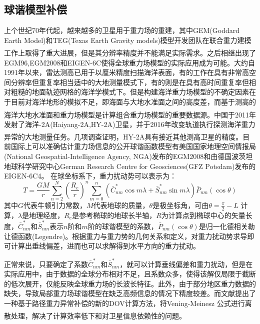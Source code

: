 \documentclass[12pt,a4,utf8]{article}
\newcommand{\upcite}[1]{\textsuperscript{\textsuperscript{\cite{#1}}}} %
\begin{document}
\subsection{球谐模型补偿}
上个世纪70年代起，越来越多的卫星用于重力场的重建，其中GEM(Goddard Earth Model)和TEG(Texas Earth Gravity models)模型开发团队在联合重力建模工作上取得了重大进展\upcite{lerch1972gravitational,tapley1997teg}，但是其分辨率精度并不能满足实际需求。之后相继出现了EGM96,EGM2008和EIGEN-6C使得全球重力场模型的实际应用成为可能。大约自1991年以来，雷达测高已用于以厘米精度扫描海洋表面，有的工作在具有非常高空间分辨率但重复率相当适中的大地测量模式下，有的则是在具有高时间重复率但相对粗糙的地面轨迹网格的海洋学模式下。但是构建海洋重力场模型的不确定因素在于目前对海洋地形的模拟不足，即海面与大地水准面之间的高度差，而基于测高的海洋大地水准面和重力场模型是计算组合重力场模型的重要数据源\upcite{pavlis2012development,flechtner2021satellite}。中国于2011年发射了海洋-2A(Haiyang-2A,HY-2A)卫星，并于2016年改变轨道执行探测海洋重力异常的大地测量任务。几项调查证明\upcite{jiang2019measurement,liu2020preliminary,wan2020vertical,zhang2020inversion,zhu2019hy,ji2021deflections,guo2022accuracy,guo2022accuracy}，HY-2A具有接近其他测高卫星的精度。目前国际上可以准确估计重力场信息的公开球谐函数模型有美国国家地理空间情报局(National Geospatial-Intelligence Agency, NGA)发布的EGM2008和由德国波茨坦地球科学研究中心German Research Centre for Geosciences(GFZ Potsdam)发布的EIGEN-6C4。
在球坐标系下，重力扰动势可以表示为：
\begin{equation}
      T = \frac{GM}{r}\sum_{n=2}^{N}{\left( \frac{R_e}{r}\right)^n\sum_{m=0}^{n}(\bar{C}_{nm}^{\ast}\cos{m\lambda} + \bar{S}_{nm}^{\ast}\sin{m\lambda})\bar{P}_{nm}(\cos \theta)} 
\end{equation}
其中$G$代表牛顿引力常数，$M$代表地球的质量，$\theta$是极坐标角，可由$\theta = \frac{\pi}{2} - L$ 计算，$\lambda$是地理经度，$R_e$是参考椭球的地球长半轴，$R$为计算点到椭球中心的矢量长度，$\bar{C}_{nm}^{\ast}$和$\bar{S}_{nm}^{\ast}$表示$n$阶和$m$阶的球谐模型的系数，$\bar{P}_{nm}(\cos \theta)$是归一化德相关勒让德函数(Legendre)。根据重力与重力势的几何关系和定义，对重力扰动势求导即可计算出垂线偏差，进而也可以求解得到水平方向的重力扰动。

正常来说，只要确定了系数$\bar{C}_{nm}^{\ast}$和$\bar{S}_{nm}^{\ast}$，就可以计算垂线偏差和重力扰动，但是在实际应用中，由于数据的全球分布相对不足，且系数众多，使得该解仅局限于截断的低次展开，仅能反映全球重力场的长波长特征。此外，由于部分地区重力数据的缺失，导致局部重力场球谐模型在缺乏高频信息的情况下精度较差。而文献\cite{hao2022analysis}提出了一种基于路径重力异常补偿的新的DOV计算方法，将Vening-Meinesz 公式进行离散处理\upcite{ning1994spherical,chen1982methods,ning2006refined}，解决了计算效率低下和对卫星信息依赖性的问题。
\end{document}
